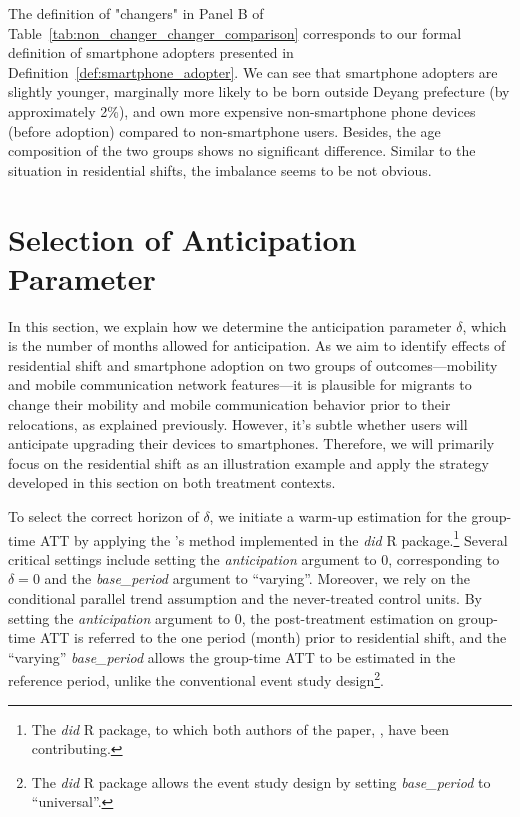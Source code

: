 The definition of "changers" in Panel B of Table~\ref{tab:non_changer_changer_comparison} corresponds to our  formal definition of smartphone adopters presented in Definition~\ref{def:smartphone_adopter}.
We can see that smartphone adopters are slightly younger, marginally more likely to be born outside Deyang prefecture (by approximately 2\%), and own more expensive non-smartphone phone devices (before adoption) compared to non-smartphone users.
Besides, the age composition of the two groups shows no significant difference.
Similar to the situation in residential shifts, the imbalance seems to be not obvious.

\clearpage\newpage
\section{Selection of Anticipation Parameter}\label{sec:anticipation}
In this section, we explain how we determine the anticipation parameter $\delta$, which is the number of months allowed for anticipation.
As we aim to identify effects of residential shift and smartphone adoption on two groups of outcomes---mobility and mobile communication network features---it is plausible for migrants to change their mobility and mobile communication behavior prior to their relocations, as explained previously.
However, it's subtle whether users will anticipate upgrading their devices to smartphones.
Therefore, we will primarily focus on the residential shift as an illustration example and apply the strategy developed in this section on both treatment contexts.

To select the correct horizon of $\delta$, we initiate a warm-up estimation for the group-time ATT by applying the \cite{callaway2021difference}'s method implemented in the \textit{did} R package.\footnote{The \textit{did} R package, to which both authors of the paper, \cite{callaway2021difference}, have been contributing.}
Several critical settings include setting the \textit{anticipation} argument to 0, corresponding to $\delta = 0$ and the \textit{base\_period} argument to ``varying''. Moreover, we rely on the conditional parallel trend assumption and the never-treated control units.
By setting the \textit{anticipation} argument to 0, the post-treatment estimation on group-time ATT is referred to the one period (month) prior to residential shift, and the ``varying'' \textit{base\_period} allows the group-time ATT to be estimated in the reference period, unlike the conventional event study design\footnote{The \textit{did} R package allows the event study design by setting \textit{base\_period} to ``universal''.}.

